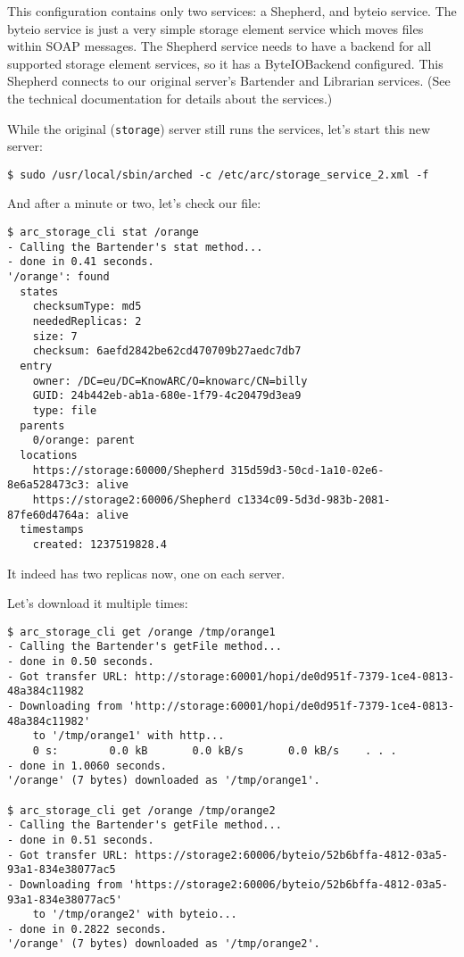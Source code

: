 \documentclass{book}
\begin{document}
This configuration contains only two services: a Shepherd, and byteio service. The byteio service is just a very simple storage element service which moves files within SOAP messages. The Shepherd service needs to have a backend for all supported storage element services, so it has a ByteIOBackend configured. This Shepherd connects to our original server's Bartender and Librarian services. (See the technical documentation for details about the services.)

While the original (\verb!storage!) server still runs the services, let's start this new server:

\begin{verbatim}
$ sudo /usr/local/sbin/arched -c /etc/arc/storage_service_2.xml -f
\end{verbatim}

And after a minute or two, let's check our file:

\begin{verbatim}
$ arc_storage_cli stat /orange
- Calling the Bartender's stat method...
- done in 0.41 seconds.
'/orange': found
  states
    checksumType: md5
    neededReplicas: 2
    size: 7
    checksum: 6aefd2842be62cd470709b27aedc7db7
  entry
    owner: /DC=eu/DC=KnowARC/O=knowarc/CN=billy
    GUID: 24b442eb-ab1a-680e-1f79-4c20479d3ea9
    type: file
  parents
    0/orange: parent
  locations
    https://storage:60000/Shepherd 315d59d3-50cd-1a10-02e6-8e6a528473c3: alive
    https://storage2:60006/Shepherd c1334c09-5d3d-983b-2081-87fe60d4764a: alive
  timestamps
    created: 1237519828.4
\end{verbatim}

It indeed has two replicas now, one on each server.

Let's download it multiple times:

\begin{verbatim}
$ arc_storage_cli get /orange /tmp/orange1
- Calling the Bartender's getFile method...
- done in 0.50 seconds.
- Got transfer URL: http://storage:60001/hopi/de0d951f-7379-1ce4-0813-48a384c11982
- Downloading from 'http://storage:60001/hopi/de0d951f-7379-1ce4-0813-48a384c11982'
    to '/tmp/orange1' with http...
    0 s:        0.0 kB       0.0 kB/s       0.0 kB/s    . . .       
- done in 1.0060 seconds.
'/orange' (7 bytes) downloaded as '/tmp/orange1'.
    
$ arc_storage_cli get /orange /tmp/orange2
- Calling the Bartender's getFile method...
- done in 0.51 seconds.
- Got transfer URL: https://storage2:60006/byteio/52b6bffa-4812-03a5-93a1-834e38077ac5
- Downloading from 'https://storage2:60006/byteio/52b6bffa-4812-03a5-93a1-834e38077ac5'
    to '/tmp/orange2' with byteio...
- done in 0.2822 seconds.
'/orange' (7 bytes) downloaded as '/tmp/orange2'.
\end{verbatim}
\end{document}
